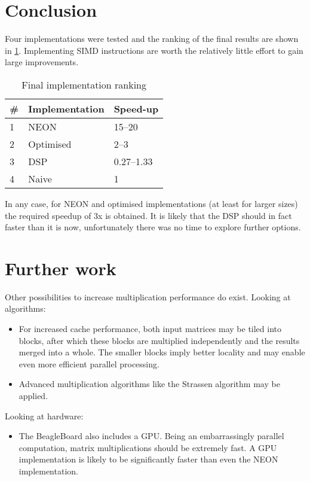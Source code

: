 \documentclass[final]{article}
\begin{document}
\section{Conclusion}
Four implementations were tested and the ranking of the final results are shown in \cref{tab:final-implementation-ranking}.
Implementing SIMD instructions are worth the relatively little effort to gain large improvements.

\begin{table}[H]
	\centering
	\caption{Final implementation ranking}
	\label{tab:final-implementation-ranking}
	\begin{tabular}{lll}
		\toprule
		\textbf{\#} & \textbf{Implementation} & \textbf{Speed-up}\\
		\midrule
		1 & NEON        &  \numrange{15}{20}\\
		2 & Optimised   &  \numrange{2}{3}\\ %
		3 & DSP         &  \numrange{0.27}{1.33}\\ %
		4 & Naive       &  1\\
		\bottomrule
	\end{tabular}
\end{table}

In any case, for NEON and optimised implementations (at least for larger sizes) the required speedup of 3x is obtained. It is likely that the DSP should in fact faster than it is now, unfortunately there was no time to explore further options.

\section{Further work}
Other possibilities to increase multiplication performance do exist.
Looking at algorithms:
\begin{itemize}
	\item For increased cache performance, both input matrices may be tiled into blocks, after which these blocks are multiplied independently and the results merged into a whole. The smaller blocks imply better locality and may enable even more efficient parallel processing.
	\item Advanced multiplication algorithms like the Strassen algorithm may be applied.
\end{itemize}
Looking at hardware:
\begin{itemize}
	\item The BeagleBoard also includes a GPU. Being an embarrassingly parallel computation, matrix multiplications should be extremely fast. A GPU implementation is likely to be significantly faster than even the NEON implementation.
\end{itemize}
\end{document}
